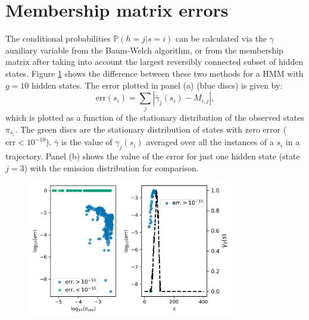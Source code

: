 \section{Membership matrix errors}\label{sec:app_membership_errors}

The conditional probabilities $\mathbb{P}(h=j|s=i)$ can be calculated via the $\gamma$ auxiliary variable from the Baum-Welch algorithm, or from the membership matrix after taking into account the largest reversibly connected subset of hidden states.  Figure \ref{fig:membership_error} shows the difference between these two methods for a HMM with $g=10$ hidden states.  The error plotted in panel (a) (blue discs) is given by:
\begin{equation}\label{eqn:err_entropy}
\mathrm{err}(s_{i}) = \sum_j|\bar{\gamma}_{j}(s_{i}) - M_{i, j}|, 
\end{equation}
which is plotted as a function of the stationary distribution of the observed states $\pi_{s_{i}}$. The green discs are the stationary distribution of states with zero error ($\mathrm{err}<10^{-10}$). $\bar{\gamma}$ is the value of $\gamma_{j}(s_{i})$ averaged over all the instances of a $s_{i}$ in a trajectory. Panel (b) shows the value of the error for just one hidden state (state $j=3$) with the emission distribution for comparison. 
\begin{figure}
    \centering
    \includegraphics[width=0.8\textwidth]{chapters/hmm_selection/figures/entropy_error_explanation.png}
    \label{fig:membership_error}
\end{figure}

